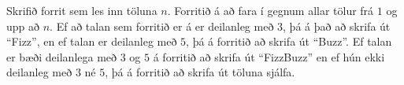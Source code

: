 \begin{problem}
	Skrifið forrit sem les inn töluna $n$.
	Forritið á að fara í gegnum allar tölur frá $1$ og upp að $n$.
	Ef að talan sem forritið er á er deilanleg með $3$, þá á það að skrifa út "`Fizz"', en ef talan er deilanleg með $5$, þá á forritið að skrifa út "`Buzz"'.
	Ef talan er bæði deilanlega með $3$ og $5$ á forritið að skrifa út "`FizzBuzz"' en ef hún ekki deilanleg með $3$ né $5$, þá á forritið að skrifa út töluna sjálfa.

\begin{example}
%
\end{example}
\begin{example}
%
\end{example}
\end{problem}